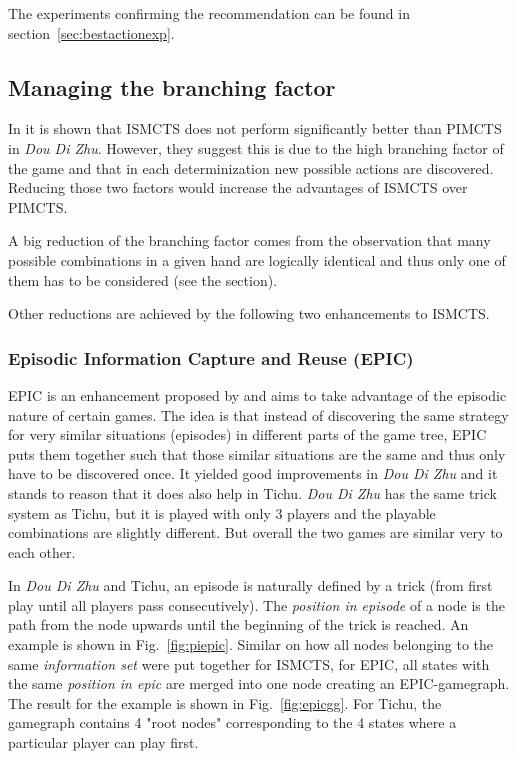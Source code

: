 The experiments confirming the recommendation can be found in section~\ref{sec:bestactionexp}.


\subsection{Managing the branching factor}
In \cite{ismcts} it is shown that ISMCTS does not perform significantly better than PIMCTS in \textit{Dou Di Zhu}. However, they suggest this is due to the high branching factor of the game and that in each determinization new possible actions are discovered. Reducing those two factors would increase the advantages of ISMCTS over PIMCTS.

A big reduction of the branching factor comes from the observation that many possible combinations in a given hand are logically identical and thus only one of them has to be considered (see the \textit{} section).

Other reductions are achieved by the following two enhancements to ISMCTS.

\subsubsection{Episodic Information Capture and Reuse (EPIC)}

EPIC is an enhancement proposed by \cite{whitehouse14} and aims to take advantage of the episodic nature of certain games. The idea is that instead of discovering the same strategy for very similar situations (episodes) in different parts of the game tree, EPIC puts them together such that those similar situations are the same and thus only have to be discovered once. \newline
It yielded good improvements in \textit{Dou Di Zhu} and it stands to reason that it does also help in Tichu.
\textit{Dou Di Zhu} has the same trick system as Tichu, but it is played with only 3 players and the playable combinations are slightly different. But overall the two games are similar very to each other.

In \textit{Dou Di Zhu} and Tichu, an episode is naturally defined by a trick (from first play until all players pass consecutively). The \textit{position in episode} of a node is the path from the node upwards until the beginning of the trick is reached. An example is shown in Fig.~\ref{fig:piepic}.
Similar on how all nodes belonging to the same \textit{information set} were put together for ISMCTS, for EPIC, all states with the same \textit{position in epic} are merged into one node creating an EPIC-gamegraph. The result for the example is shown in Fig.~\ref{fig:epicgg}.
For Tichu, the gamegraph contains 4 "root nodes" corresponding to the 4 states where a particular player can play first.

